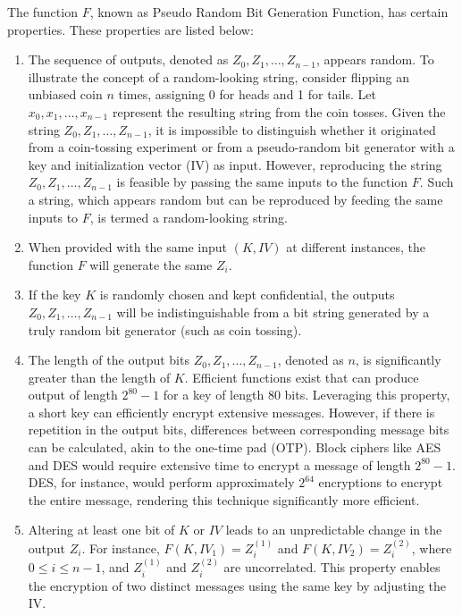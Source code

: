 \documentclass[11pt]{article}
\begin{document}
The function \(F\), known as Pseudo Random Bit Generation Function, has certain properties. These properties are listed below:
\begin{enumerate}
    \item The sequence of outputs, denoted as $Z_0, Z_1, \ldots, Z_{n-1}$, appears random. To illustrate the concept of a random-looking string, consider flipping an unbiased coin $n$ times, assigning 0 for heads and 1 for tails. Let $x_0, x_1, \ldots, x_{n-1}$ represent the resulting string from the coin tosses. Given the string $Z_0, Z_1, \ldots, Z_{n-1}$, it is impossible to distinguish whether it originated from a coin-tossing experiment or from a pseudo-random bit generator with a key and initialization vector (IV) as input. However, reproducing the string $Z_0, Z_1, \ldots, Z_{n-1}$ is feasible by passing the same inputs to the function $F$. Such a string, which appears random but can be reproduced by feeding the same inputs to $F$, is termed a random-looking string.
    
    \item When provided with the same input $(K, IV)$ at different instances, the function $F$ will generate the same $Z_i$.
    
    \item If the key $K$ is randomly chosen and kept confidential, the outputs $Z_0, Z_1, \ldots, Z_{n-1}$ will be indistinguishable from a bit string generated by a truly random bit generator (such as coin tossing).
    
    \item The length of the output bits $Z_0, Z_1, \ldots, Z_{n-1}$, denoted as $n$, is significantly greater than the length of $K$. Efficient functions exist that can produce output of length $2^{80} - 1$ for a key of length 80 bits. Leveraging this property, a short key can efficiently encrypt extensive messages. However, if there is repetition in the output bits, differences between corresponding message bits can be calculated, akin to the one-time pad (OTP). Block ciphers like AES and DES would require extensive time to encrypt a message of length $2^{80} - 1$. DES, for instance, would perform approximately $2^{64}$ encryptions to encrypt the entire message, rendering this technique significantly more efficient.
    
    \item Altering at least one bit of $K$ or $IV$ leads to an unpredictable change in the output $Z_i$. For instance, $F(K, IV_1) = Z^{(1)}_i$ and $F(K, IV_2) = Z^{(2)}_i$, where $0 \leq i \leq n-1$, and $Z^{(1)}_i$ and $Z^{(2)}_i$ are uncorrelated. This property enables the encryption of two distinct messages using the same key by adjusting the IV.
\end{enumerate}
\end{document}
